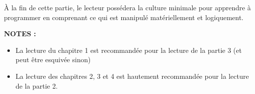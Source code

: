 \documentclass[../../main.tex]{subfiles}
\begin{document}
À la fin de cette partie, le lecteur possédera la culture minimale pour apprendre à programmer en comprenant ce qui est manipulé matériellement et logiquement.

\textbf{NOTES :}
\begin{itemize}
	\item La lecture du chapitre 1 est recommandée pour la lecture de la partie 3 (et peut être esquivée sinon)
	\item La lecture des chapitres 2, 3 et 4 est hautement recommandée pour la lecture de la partie 2.
\end{itemize}
\hrulefill
\newpage
\end{document}

